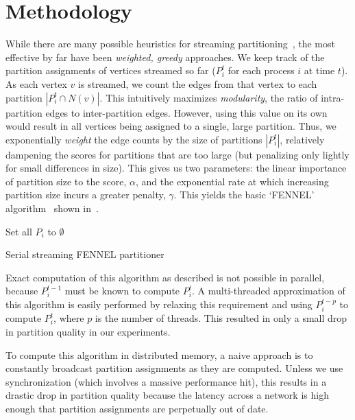 \section{Methodology}
While there are many possible heuristics for streaming partitioning~\cite{Stanton:2012:SGP:2339530.2339722}, the most effective by far have been \emph{weighted, greedy} approaches. We keep track of the partition assignments of vertices streamed so far ($P_i^t$ for each process $i$ at time $t$). As each vertex $v$ is streamed, we count the edges from that vertex to each partition $|P_i^t \cap N(v)|$. This intuitively maximizes \emph{modularity}, the ratio of intra-partition edges to inter-partition edges. However, using this value on its own would result in all vertices being assigned to a single, large partition. Thus, we exponentially \emph{weight} the edge counts by the size of partitions $|P_i^t|$, relatively dampening the scores for partitions that are too large (but penalizing only lightly for small differences in size). This gives us two parameters: the linear importance of partition size to the score, $\alpha$, and the exponential rate at which increasing partition size incurs a greater penalty, $\gamma$. This yields the basic `FENNEL' algorithm~\cite{tsourakakis2012fennel} shown in~.

\begin{algorithm}
 Set all $P_i$ to $\emptyset$\;
 \caption{Serial streaming FENNEL partitioner}
 \label{alg:fennel}
\end{algorithm}

Exact computation of this algorithm as described is not possible in parallel, because $P_i^{t-1}$ must be known to compute $P_i^t$. A multi-threaded approximation of this algorithm is easily performed by relaxing this requirement and using $P_i^{t-p}$ to compute $P_i^t$, where $p$ is the number of threads. This resulted in only a small drop in partition quality in our experiments.

To compute this algorithm in distributed memory, a naive approach is to constantly broadcast partition assignments as they are computed. Unless we use synchronization (which involves a massive performance hit), this results in a drastic drop in partition quality because the latency across a network is high enough that partition assignments are perpetually out of date. 

